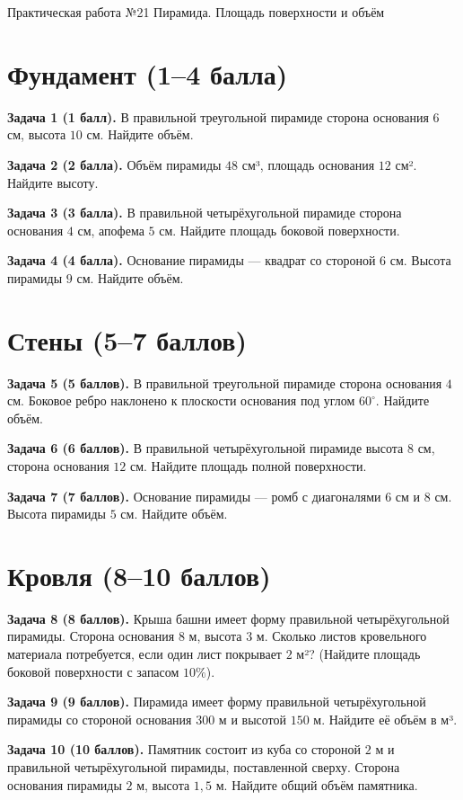 \documentclass{umk-matematika}
\begin{document}
\maketitlepage
    {Практическая работа №21}
    {Пирамида. Площадь поверхности и объём}
    {}

\section{Фундамент (1--4 балла)}

\textbf{Задача 1 (1 балл).} В правильной треугольной пирамиде сторона основания $6$ см, высота $10$ см. Найдите объём.

\textbf{Задача 2 (2 балла).} Объём пирамиды $48$ см³, площадь основания $12$ см². Найдите высоту.

\textbf{Задача 3 (3 балла).} В правильной четырёхугольной пирамиде сторона основания $4$ см, апофема $5$ см. Найдите площадь боковой поверхности.

\textbf{Задача 4 (4 балла).} Основание пирамиды — квадрат со стороной $6$ см. Высота пирамиды $9$ см. Найдите объём.

\section{Стены (5--7 баллов)}

\textbf{Задача 5 (5 баллов).} В правильной треугольной пирамиде сторона основания $4$ см. Боковое ребро наклонено к плоскости основания под углом $60^\circ$. Найдите объём.

\textbf{Задача 6 (6 баллов).} В правильной четырёхугольной пирамиде высота $8$ см, сторона основания $12$ см. Найдите площадь полной поверхности.

\textbf{Задача 7 (7 баллов).} Основание пирамиды — ромб с диагоналями $6$ см и $8$ см. Высота пирамиды $5$ см. Найдите объём.

\section{Кровля (8--10 баллов)}

\textbf{Задача 8 (8 баллов).} Крыша башни имеет форму правильной четырёхугольной пирамиды. Сторона основания $8$ м, высота $3$ м. Сколько листов кровельного материала потребуется, если один лист покрывает $2$ м²? (Найдите площадь боковой поверхности с запасом $10\%$).

\textbf{Задача 9 (9 баллов).} Пирамида имеет форму правильной четырёхугольной пирамиды со стороной основания $300$ м и высотой $150$ м. Найдите её объём в м³.

\textbf{Задача 10 (10 баллов).} Памятник состоит из куба со стороной $2$ м и правильной четырёхугольной пирамиды, поставленной сверху. Сторона основания пирамиды $2$ м, высота $1{,}5$ м. Найдите общий объём памятника.
\end{document}
